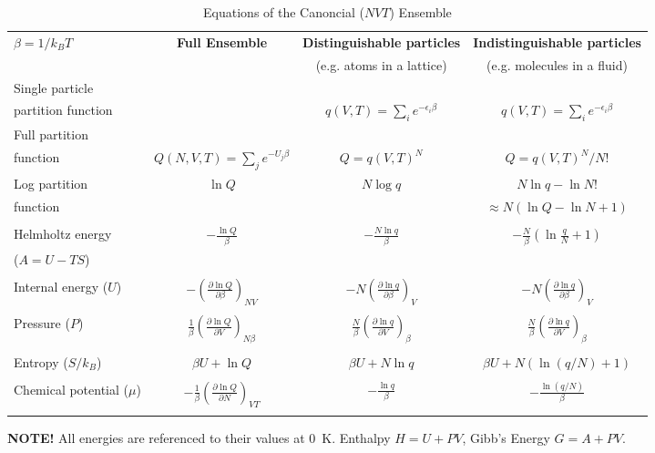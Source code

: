\documentclass[11pt]{article}
\begin{document}
\begin{table}\small
  \begin{center}
    \caption{Equations of the Canoncial ($NVT$) Ensemble}
    \label{Canonical}
    \begin{tabular}[h]{lccc}
      \hline
$\beta=1/k_BT$ & {\bf Full Ensemble} & {\bf Distinguishable particles} & {\bf Indistinguishable
particles} \\
               &               & (e.g. atoms in a lattice) & (e.g. molecules in
               a fluid) \\
\hline
Single particle & & & \\partition function& & $\displaystyle q(V,T) = \sum_i
e^{-\epsilon_i\beta} $& $\displaystyle q(V,T) = \sum_i e^{-\epsilon_i\beta} $ \\
Full partition & & & \\function & $\displaystyle Q(N,V,T) = \sum_j e^{-U_j\beta} $ &
$\displaystyle Q = q(V,T)^N $ & $\displaystyle Q = q(V,T)^N/N! $ \\
Log partition &  $\ln Q$ & $N\log q$ & $ N\ln q - \ln N! $\\
function & & & $\approx N(\ln Q - \ln N +1)$ \\ & & & \\
Helmholtz energy & $\displaystyle -\frac{\ln Q}{\beta}$ & $\displaystyle
-\frac{N\ln q}{\beta}$ & $\displaystyle -\frac{N}{\beta}\left (\ln\frac{q}{N} +
  1 \right ) $ \\
($A=U-TS$) & & & \\ & & &  \\
Internal energy ($U$)& $\displaystyle -\left (\frac{\partial\ln
    Q}{\partial\beta}\right )_{NV}$ & $\displaystyle -N\left (\frac{\partial\ln
    q}{\partial\beta}\right )_{V}$ &  $\displaystyle -N\left (\frac{\partial\ln
    q}{\partial\beta}\right )_{V}$ \\ & & & \\
Pressure ($P$) & $\displaystyle \frac{1}{\beta}\left (\frac{\partial\ln
    Q}{\partial V}\right )_{N\beta}$ & $\displaystyle \frac{N}{\beta}\left (\frac{\partial\ln
    q}{\partial V}\right )_{\beta}$ &  $\displaystyle \frac{N}{\beta}\left (\frac{\partial\ln
    q}{\partial V}\right )_{\beta}$ \\ & & & \\

Entropy ($S/k_B$) & $ \beta U + \ln Q$ & $\beta U + N \ln q$ & $\beta U +
N\left ( \ln(q/N) + 1\right )$ \\ & & & \\
Chemical potential ($\mu$) & $\displaystyle -\frac{1}{\beta}\left ( \frac{\partial \ln
    Q}{\partial N}\right )_{VT} $& $\displaystyle -\frac{\ln q}{\beta}$ & $\displaystyle
-\frac{\ln (q/N)}{\beta}$ \\ & & & \\
\hline
    \end{tabular}
{\bf NOTE!} All energies are referenced to their values at 0~K.  Enthalpy $H=U+PV$, Gibb's
Energy $G=A+PV$.
  \end{center}
\end{table}
\end{document}
